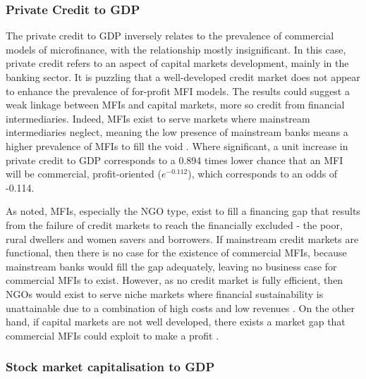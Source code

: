 \documentclass[a4paper, nobind]{templates/ociamthesis}
\begin{document}
\hypertarget{private-credit-to-gdp}{%
\subsubsection{Private Credit to GDP}\label{private-credit-to-gdp}}

The private credit to GDP inversely relates to the prevalence of commercial models of microfinance, with the relationship mostly insignificant. In this case, private credit refers to an aspect of capital markets development, mainly in the banking sector. It is puzzling that a well-developed credit market does not appear to enhance the prevalence of for-profit MFI models. The results could suggest a weak linkage between MFIs and capital markets, more so credit from financial intermediaries. Indeed, MFIs exist to serve markets where mainstream intermediaries neglect, meaning the low presence of mainstream banks means a higher prevalence of MFIs to fill the void \autocite{de2007economics}. Where significant, a unit increase in private credit to GDP corresponds to a 0.894 times lower chance that an MFI will be commercial, profit-oriented (\(e^{-0.112}\)), which corresponds to an odds of -0.114.

As noted, MFIs, especially the NGO type, exist to fill a financing gap that results from the failure of credit markets to reach the financially excluded - the poor, rural dwellers and women savers and borrowers. If mainstream credit markets are functional, then there is no case for the existence of commercial MFIs, because mainstream banks would fill the gap adequately, leaving no business case for commercial MFIs to exist. However, as no credit market is fully efficient, then NGOs would exist to serve niche markets where financial sustainability is unattainable due to a combination of high costs and low revenues \autocite{de2007economics}. On the other hand, if capital markets are not well developed, there exists a market gap that commercial MFIs could exploit to make a profit \autocite{d2013unsubsidized,armendariz2013subsidy}.

\hypertarget{stock-market-capitalisation-to-gdp}{%
\subsubsection{Stock market capitalisation to GDP}\label{stock-market-capitalisation-to-gdp}}
\end{document}
